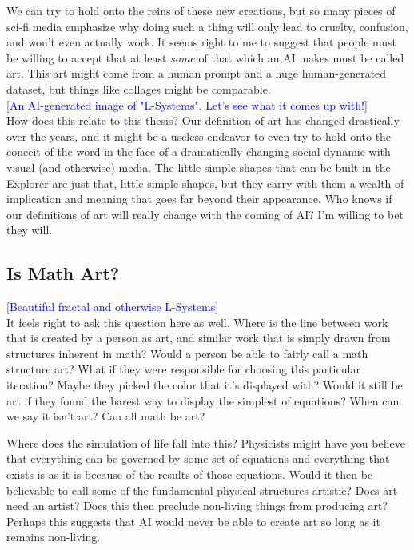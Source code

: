 \documentclass[12pt,twoside]{reedthesis}
\begin{document}
	We can try to hold onto the reins of these new creations, but so many pieces of sci-fi media emphasize why doing such a thing will only lead to cruelty, confusion, and won't even actually work. It seems right to me to suggest that people must be willing to accept that at least \textit{some} of that which an AI makes must be called art. This art might come from a human prompt and a huge human-generated dataset, but things like collages might be comparable.\\
	
	\textcolor{blue}{[An AI-generated image of "L-Systems". Let's see what it comes up with!]}\\
	
	How does this relate to this thesis? Our definition of art has changed drastically over the years, and it might be a useless endeavor to even try to hold onto the conceit of the word in the face of a dramatically changing social dynamic with visual (and otherwise) media. The little simple shapes that can be built in the Explorer are just that, little simple shapes, but they carry with them a wealth of implication and meaning that goes far beyond their appearance. Who knows if our definitions of art will really change with the coming of AI? I'm willing to bet they will.

\subsection{Is Math Art?}

	\textcolor{blue}{[Beautiful fractal and otherwise L-Systems]}\\

	It feels right to ask this question here as well. Where is the line between work that is created by a person as art, and similar work that is simply drawn from structures inherent in math? Would a person be able to fairly call a math structure art? What if they were responsible for choosing this particular iteration? Maybe they picked the color that it's displayed with? Would it still be art if they found the barest way to display the simplest of equations? When can we say it isn't art? Can all math be art?
	
	Where does the simulation of life fall into this? Physicists might have you believe that everything can be governed by some set of equations and everything that exists is as it is because of the results of those equations. Would it then be believable to call some of the fundamental physical structures artistic? Does art need an artist? Does this then preclude non-living things from producing art? Perhaps this suggests that AI would never be able to create art so long as it remains non-living.\\
	
\end{document}

